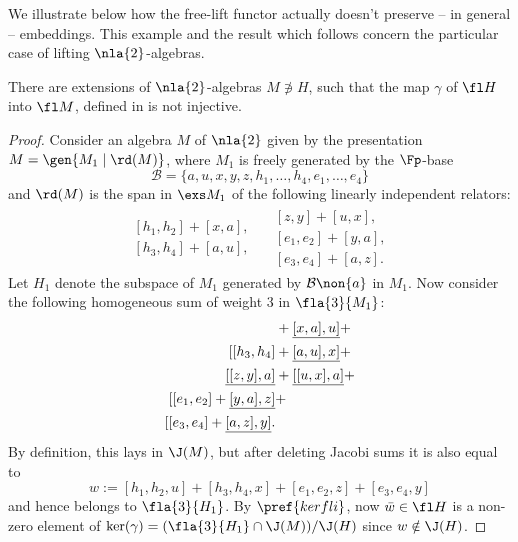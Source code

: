 \medskip
We illustrate below how the free-lift functor actually doesn't preserve -- in general -- embeddings. This example and
the result which follows concern the particular case of lifting $\nla{2}$-algebras.
\begin{rem}\label{nonmono}
There are extensions of $\nla{2}$-algebras $M\nni H$, such that the map $\gamma$ of $\fl H$ into $\fl M$, defined in
 is not injective.
\end{rem}
\begin{proof}
Consider an algebra $M$ of $\nla{2}$ given by the presentation $M=\gen{M_{1}\mid\rd(M)}$, where $M_{1}$ is freely generated
by the $\Fp$-base $$\mathcal{B}=\{a,u,x,y,z,h_{1},\dots,h_{4},e_{1},\dots,e_{4}\}$$
and $\rd(M)$ is the span in $\exs M_{1}$ of the following linearly independent relators:
\begin{gather*}
\begin{split}
[h_{1},h_{2}]+[x,a],\\
[h_{3},h_{4}]+[a,u],
\end{split}\quad
\begin{split}
[z,y]+[u,x],\\
[e_{1},e_{2}]+[y,a],\\
[e_{3},e_{4}]+[a,z].
\end{split}
\end{gather*}
Let $H_{1}$ denote the subspace of $M_{1}$ generated by
$\mathcal{B}\non\{a\}$ in $M_{1}$.
Now consider the following homogeneous sum of weight $3$ in $\fla{3}{M_{1}}$:
\begin{align*}
[[h_{1},h_{2}]&+\uline{[x,a],u]}+\\
[[h_{3},h_{4}]&+\uline{[a,u],x]}+\\
\uline{[[z,y],a]}&+\uline{[[u,x],a]}+\\
[[e_{1},e_{2}]+\uline{[y,a],z]}&+\\
[[e_{3},e_{4}]+\uline{[a,z],y]}.&
\end{align*}
By definition, this lays in $\J(M)$, but after deleting Jacobi sums it is also equal to
$$
w:=[h_{1},h_{2},u]+[h_{3},h_{4},x]+[e_{1},e_{2},z]+[e_{3},e_{4},y]
$$
and hence belongs to $\fla{3}{H_{1}}$. By $\pref{kerfli}$, now $\bar w\in \fl H$ is a non-zero element of $\ker(\gamma)=(\fla{3}{H_{1}}\cap\J(M))/
\J(H)$ since $w\notin\J(H)$.
\end{proof}
